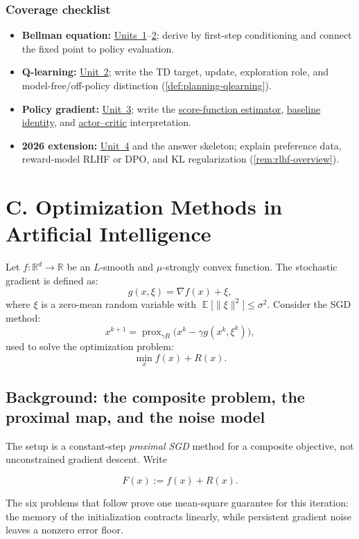 \documentclass[11pt,a4paper]{article}
\DeclareMathOperator{\E}{\mathbb{E}}
\DeclareMathOperator{\prox}{prox}
\newcommand{\jump}[2]{\hyperref[#1]{#2}}
\newcommand{\unitref}[1]{\hyperref[unit:#1]{Unit~#1}}
\theoremstyle{definition}
\begin{document}
\subsubsection{Coverage checklist}

\begin{itemize}
    \item \textbf{Bellman equation:} \hyperref[unit:1]{Units~1}--\hyperref[unit:2]{2}; derive by first-step conditioning and
    connect the fixed point to policy evaluation.
    \item \textbf{Q-learning:} \unitref{2}; write the TD target, update, exploration role, and
    model-free/off-policy distinction (\cref{def:planning-qlearning}).
    \item \textbf{Policy gradient:} \unitref{3}; write the
    \jump{eq:policy-gradient}{score-function estimator}, \jump{thm:baseline}{baseline
    identity}, and \jump{def:actor-critic}{actor--critic} interpretation.
    \item \textbf{2026 extension:} \unitref{4} and the answer skeleton; explain preference data,
    reward-model RLHF or DPO, and KL regularization (\cref{rem:rlhf-overview}).
\end{itemize}

\section{C. Optimization Methods in Artificial Intelligence}

Let $f : \mathbb{R}^d \to \mathbb{R}$ be an $L$-smooth and $\mu$-strongly convex function. The stochastic gradient is defined as:
\[
g(x, \xi) = \nabla f(x) + \xi,
\]
where $\xi$ is a zero-mean random variable with $\E \bigl[ \|\xi\|^2 \bigr] \le \sigma^2$. Consider the SGD method:
\[
x^{k+1} = \prox_{\gamma R} \bigl( x^k - \gamma g(x^k, \xi^k) \bigr),
\]
used to solve the optimization problem:
\[
\min_{x} f(x) + R(x).
\]

\subsection{Background: the composite problem, the proximal map, and the noise model}

The setup is a constant-step \emph{proximal SGD} method for a composite objective, not unconstrained gradient descent. Write

\[
F(x):=f(x)+R(x).
\]

The six problems that follow prove one mean-square guarantee for this iteration: the memory of the initialization contracts linearly, while persistent gradient noise leaves a nonzero error floor.
\end{document}
